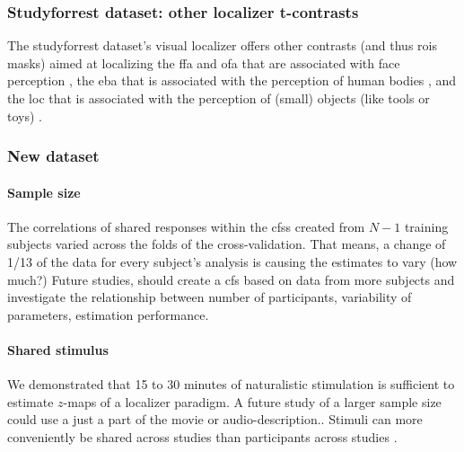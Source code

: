 \subsubsection{Studyforrest dataset: other localizer t-contrasts}


The studyforrest dataset's visual localizer \citep{sengupta2016extension} offers
other contrasts (and thus \acp{roi} masks) aimed at localizing the \ac{ffa} and
\ac{ofa} that are associated with face perception \citep{kanwisher1997ffa,
pitcher2011occipitalfacearea}, the \ac{eba} that  is associated with the
perception of human bodies \citep{downing2001bodyarea}, and the \ac{loc} that is
associated with the perception of (small) objects (like tools or toys)
\citep{malach1995loc}.



\subsubsection{New dataset}

\paragraph{Sample size}



The correlations of shared responses within the \acp{cfs} created from $N-1$
training subjects varied across the folds of the cross-validation.
That means, a change of 1/13 of the data for every subject's analysis is causing
the estimates to vary (how much?)
Future studies, should create a \ac{cfs} based on data from more subjects and
investigate the relationship between number of participants, variability of
parameters, estimation performance.


\paragraph{Shared stimulus}

%
We demonstrated that 15 to 30 minutes of naturalistic stimulation is sufficient
to estimate $z$-maps of a localizer paradigm.
%
A future study of a larger sample size could use a just a part of the movie or
audio-description..
%
Stimuli can more conveniently be shared across studies than participants across
studies \citep[cf.][an extension of the \ac{srm} for shared subjects
across datasets]{zhang2018transfer}.



